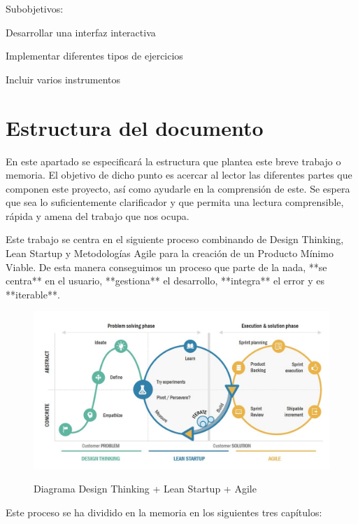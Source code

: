 \documentclass[12pt,twoside,titlepage]{report}
\begin{document}
Subobjetivos:
\begin{compactitem}
    \item Desarrollar una interfaz interactiva
    \item Implementar diferentes tipos de ejercicios 
    \item Incluir varios instrumentos
\end{compactitem}

\section{Estructura del documento}

En este apartado se especificará la estructura que plantea este breve trabajo o memoria. El objetivo de dicho punto es acercar al lector las diferentes partes que componen este proyecto, así como ayudarle en la comprensión de este. Se espera que sea lo suficientemente clarificador y que permita una lectura comprensible, rápida y amena del trabajo que nos ocupa.

Este trabajo se centra en el siguiente proceso combinando de Design Thinking, Lean Startup y Metodologías Agile para la creación de un Producto Mínimo Viable. De esta manera conseguimos un proceso que parte de la nada, **se centra** en el usuario, **gestiona** el desarrollo, **integra** el error y es **iterable**.

\begin{figure}[H] 
    \includegraphics[scale=0.45]{LeanDesignAgile}
    \centering
    \label{fig:Lean Design Agile}
    \caption{Diagrama Design Thinking + Lean Startup + Agile}
\end{figure}

Este proceso se ha dividido en la memoria en los siguientes tres capítulos:
\end{document}
